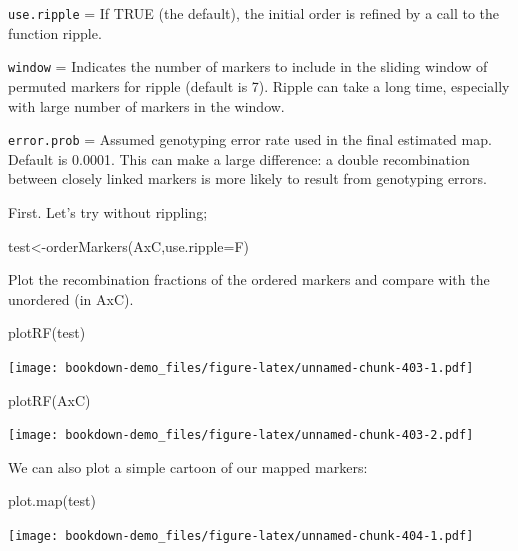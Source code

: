 \documentclass[
]{book}
\newenvironment{Shaded}{\begin{snugshade}}{\end{snugshade}}
\newcommand{\AttributeTok}[1]{\textcolor[rgb]{0.77,0.63,0.00}{#1}}
\newcommand{\FunctionTok}[1]{\textcolor[rgb]{0.00,0.00,0.00}{#1}}
\newcommand{\NormalTok}[1]{#1}
\newcommand{\OtherTok}[1]{\textcolor[rgb]{0.56,0.35,0.01}{#1}}
\begin{document}
\texttt{use.ripple} = If TRUE (the default), the initial order is refined by a call to the function ripple.

\texttt{window} = Indicates the number of markers to include in the sliding window of permuted markers for ripple (default is 7). Ripple can take a long time, especially with large number of markers in the window.

\texttt{error.prob} = Assumed genotyping error rate used in the final estimated map. Default is 0.0001. This can make a large difference: a double recombination between closely linked markers is more likely to result from genotyping errors.

First. Let's try without rippling;

\begin{Shaded}
\begin{Highlighting}[]
\NormalTok{test}\OtherTok{\textless{}{-}}\FunctionTok{orderMarkers}\NormalTok{(AxC,}\AttributeTok{use.ripple=}\NormalTok{F)}
\end{Highlighting}
\end{Shaded}

Plot the recombination fractions of the ordered markers and compare with the unordered (in AxC).

\begin{Shaded}
\begin{Highlighting}[]
\FunctionTok{plotRF}\NormalTok{(test)}
\end{Highlighting}
\end{Shaded}

\texttt{[image: bookdown-demo\_files/figure-latex/unnamed-chunk-403-1.pdf]}

\begin{Shaded}
\begin{Highlighting}[]
\FunctionTok{plotRF}\NormalTok{(AxC)}
\end{Highlighting}
\end{Shaded}

\texttt{[image: bookdown-demo\_files/figure-latex/unnamed-chunk-403-2.pdf]}

We can also plot a simple cartoon of our mapped markers:

\begin{Shaded}
\begin{Highlighting}[]
\FunctionTok{plot.map}\NormalTok{(test)}
\end{Highlighting}
\end{Shaded}

\texttt{[image: bookdown-demo\_files/figure-latex/unnamed-chunk-404-1.pdf]}
\end{document}
